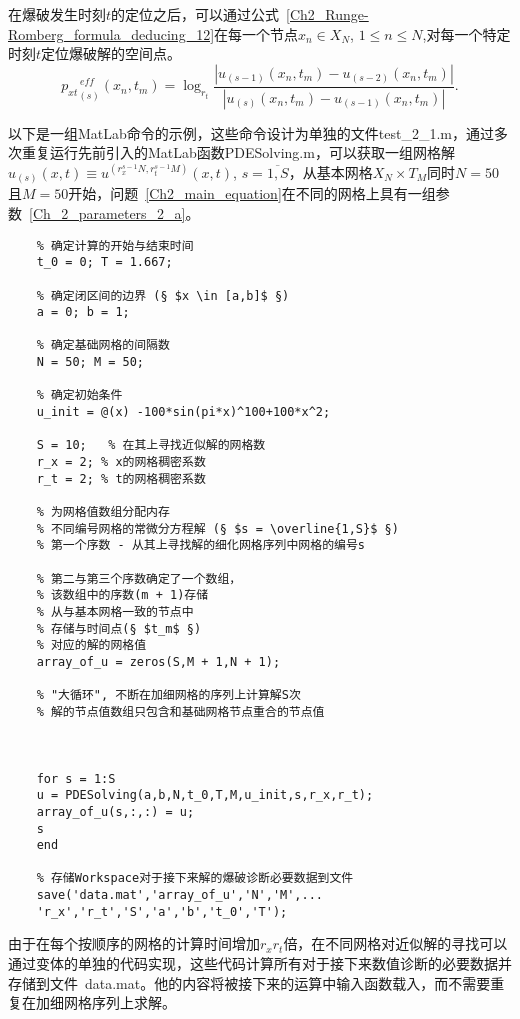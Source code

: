 \documentclass[twoside]{book}
\begin{document}
\begin{CJK*}{GBK}{song}
	在爆破发生时刻$t$的定位之后，可以通过公式~\eqref{Ch2_Runge-Romberg_formula_deducing_12}在每一个节点$x_n \in X_N$, $1 \leqslant n \leqslant N$,对每一个特定时刻$t$定位爆破解的空间点。
	\begin{equation}
	\label{Ch2_p_eff_for_every_spatial_point}
	{p_{xt}}^{\, eff}_{(s)}(x_n,t_m) = \log_{r_t}{\dfrac{|u_{(s - 1)}(x_n,t_m) - u_{(s - 2)}(x_n,t_m)|}{|u_{(s)}(x_n,t_m) - u_{(s - 1)}(x_n,t_m)|}}.
	\end{equation}

	
	以下是一组MatLab命令的示例，这些命令设计为单独的文件test\_2\_1.m，通过多次重复运行先前引入的MatLab函数PDESolving.m，可以获取一组网格解$u_{(s)}(x,t) \equiv u^{(r_x^{s - 1}N,r_t^{s - 1}M)}(x,t)$, $s = \overline{1,S}$，从基本网格$X_N \times T_M$同时$N = 50$且$M= 50$开始，问题~\eqref{Ch2_main_equation}在不同的网格上具有一组参数~\eqref{Ch_2_parameters_2_a}。
	\begin{lstlisting}
	% 确定计算的开始与结束时间
	t_0 = 0; T = 1.667;
	
	% 确定闭区间的边界 (§ $x \in [a,b]$ §)
	a = 0; b = 1;
	
	% 确定基础网格的间隔数
	N = 50; M = 50;
	
	% 确定初始条件
	u_init = @(x) -100*sin(pi*x)^100+100*x^2;
	
	S = 10;   % 在其上寻找近似解的网格数
	r_x = 2; % x的网格稠密系数
	r_t = 2; % t的网格稠密系数
	
	% 为网格值数组分配内存
	% 不同编号网格的常微分方程解 (§ $s = \overline{1,S}$ §)
	% 第一个序数 - 从其上寻找解的细化网格序列中网格的编号s

	% 第二与第三个序数确定了一个数组，
	% 该数组中的序数(m + 1)存储
	% 从与基本网格一致的节点中
	% 存储与时间点(§ $t_m$ §)
	% 对应的解的网格值
	array_of_u = zeros(S,M + 1,N + 1);
	
	% "大循环", 不断在加细网格的序列上计算解S次
	% 解的节点值数组只包含和基础网格节点重合的节点值



	for s = 1:S
	u = PDESolving(a,b,N,t_0,T,M,u_init,s,r_x,r_t);
	array_of_u(s,:,:) = u;
	s
	end
	
	% 存储Workspace对于接下来解的爆破诊断必要数据到文件
	save('data.mat','array_of_u','N','M',...
	'r_x','r_t','S','a','b','t_0','T');
	\end{lstlisting}
	
	由于在每个按顺序的网格的计算时间增加$r_x r_t$倍，在不同网格对近似解的寻找可以通过变体的单独的代码实现，这些代码计算所有对于接下来数值诊断的必要数据并存储到文件~data.mat。他的内容将被接下来的运算中输入函数载入，而不需要重复在加细网格序列上求解。


\end{CJK*}
\end{document}
